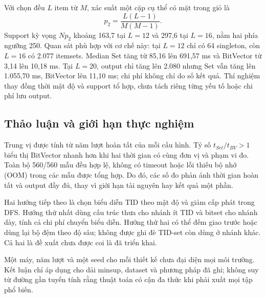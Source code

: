 Với chọn đều $L$ item từ $M$, xác suất một cặp cụ thể có mặt trong giỏ là
\begin{equation}
p_2=\frac{L(L-1)}{M(M-1)}.
\end{equation}
Support kỳ vọng $Np_2$ khoảng 163,7 tại $L=12$ và 297,6 tại $L=16$, nằm
hai phía ngưỡng 250. Quan sát phù hợp với cơ chế này: tại $L=12$ chỉ có
64 singleton, còn $L=16$ có 2.077 itemsets. Median Set tăng từ 85,16 lên
691,57 ms và BitVector từ 3,14 lên 10,18 ms. Tại $L=20$, output chỉ tăng
lên 2.080 nhưng Set vẫn tăng lên 1.055,70 ms, BitVector lên 11,10 ms;
chi phí không chỉ do số kết quả. Thí nghiệm thay đồng thời mật độ và
support tổ hợp, chưa tách riêng từng yếu tố hoặc chi phí lưu output.

\subsection{Thảo luận và giới hạn thực nghiệm}
Trung vị được tính từ năm lượt hoàn tất của mỗi cấu hình. Tỷ số
$t_{Set}/t_{BV}>1$ biểu thị BitVector nhanh hơn khi hai thời gian có
cùng đơn vị và phạm vi đo. Toàn bộ 560/560 mẫu đều hợp lệ, không có
timeout hoặc lỗi thiếu bộ nhớ (OOM) trong các mẫu được tổng hợp. Do đó,
các số đo phản ánh thời gian hoàn tất và output đầy đủ, thay vì giới hạn
tài nguyên hay kết quả một phần.

Hai hướng tiếp theo là chọn biểu diễn TID theo mật độ và giảm cấp phát
trong DFS. Hướng thứ nhất dùng cấu trúc thưa cho nhánh ít TID và bitset
cho nhánh dày, tính cả chi phí chuyển biểu diễn. Hướng thứ hai có thể
đếm giao trước hoặc dùng lại bộ đệm theo độ sâu; không được ghi đè TID-set
còn dùng ở nhánh khác. Cả hai là đề xuất chưa được coi là đã triển khai.

Một máy, năm lượt và một seed cho mỗi thiết kế chưa đại diện mọi môi
trường. Kết luận chỉ áp dụng cho dải minsup, dataset và phương pháp đã
ghi; không suy từ đường gần tuyến tính rằng thuật toán có cận đa thức
khi phải xuất mọi tập phổ biến.
